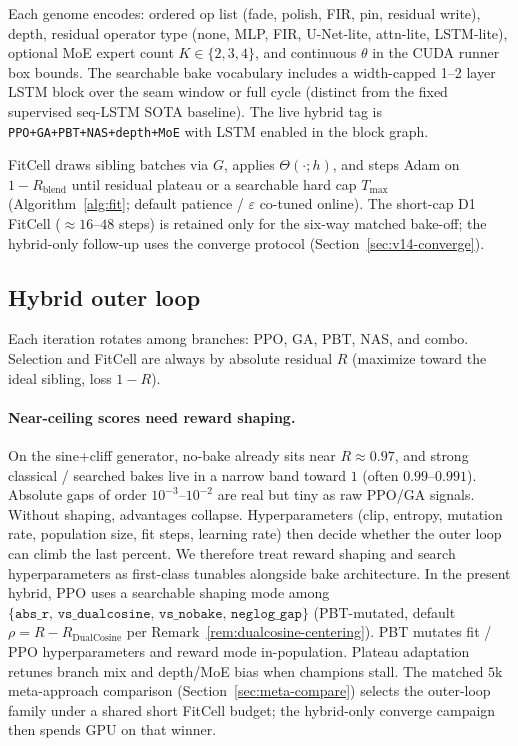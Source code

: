 Each genome encodes: ordered op list (fade, polish, FIR, pin, residual write), depth, residual operator type (none, MLP, FIR, U-Net-lite, attn-lite, LSTM-lite), optional MoE expert count $K\in\{2,3,4\}$, and continuous $\theta$ in the CUDA runner box bounds.
The searchable bake vocabulary includes a width-capped 1--2 layer LSTM block over the seam window or full cycle (distinct from the fixed supervised seq-LSTM SOTA baseline).
The live hybrid tag is \texttt{PPO+GA+PBT+NAS+depth+MoE} with LSTM enabled in the block graph.

FitCell draws sibling batches via $G$, applies $\Theta(\cdot;h)$, and steps Adam on $1-R_{\mathrm{blend}}$ until residual plateau or a searchable hard cap $T_{\max}$ (Algorithm~\ref{alg:fit}; default patience / $\varepsilon$ co-tuned online).
The short-cap D1 FitCell (${\approx}16$--$48$ steps) is retained only for the six-way matched bake-off; the hybrid-only follow-up uses the converge protocol (Section~\ref{sec:v14-converge}).

\subsection{Hybrid outer loop}
\label{sec:hybrid}

Each iteration rotates among branches: PPO, GA, PBT, NAS, and combo.
Selection and FitCell are always by absolute residual $R$ (maximize toward the ideal sibling, loss $1-R$).

\paragraph{Near-ceiling scores need reward shaping.}
\label{sec:reward-shaping}
On the sine{+}cliff generator, no-bake already sits near $R\approx 0.97$, and strong classical / searched bakes live in a narrow band toward $1$ (often $0.99$--$0.991$).
Absolute gaps of order $10^{-3}$--$10^{-2}$ are real but tiny as raw PPO/GA signals.
Without shaping, advantages collapse.
Hyperparameters (clip, entropy, mutation rate, population size, fit steps, learning rate) then decide whether the outer loop can climb the last percent.
We therefore treat reward shaping and search hyperparameters as first-class tunables alongside bake architecture.
In the present hybrid, PPO uses a searchable shaping mode among $\{\texttt{abs\_r},\,\texttt{vs\_dualcosine},\,\texttt{vs\_nobake},\,\texttt{neglog\_gap}\}$ (PBT-mutated, default $\rho = R - R_{\mathrm{DualCosine}}$ per Remark~\ref{rem:dualcosine-centering}).
PBT mutates fit / PPO hyperparameters and reward mode in-population. Plateau adaptation retunes branch mix and depth/MoE bias when champions stall.
The matched $5$k meta-approach comparison (Section~\ref{sec:meta-compare}) selects the outer-loop family under a shared short FitCell budget; the hybrid-only converge campaign then spends GPU on that winner.

